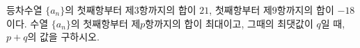 등차수열 $\{a_n\}$의 첫째항부터 제$3$항까지의 합이 $21$, 첫째항부터 제$9$항까지의 합이 $-18$이다. 수열 $\{a_n\}$의 첫째항부터 제$p$항까지의 합이 최대이고, 그때의 최댓값이 $q$일 때, $p+q$의 값을 구하시오.
